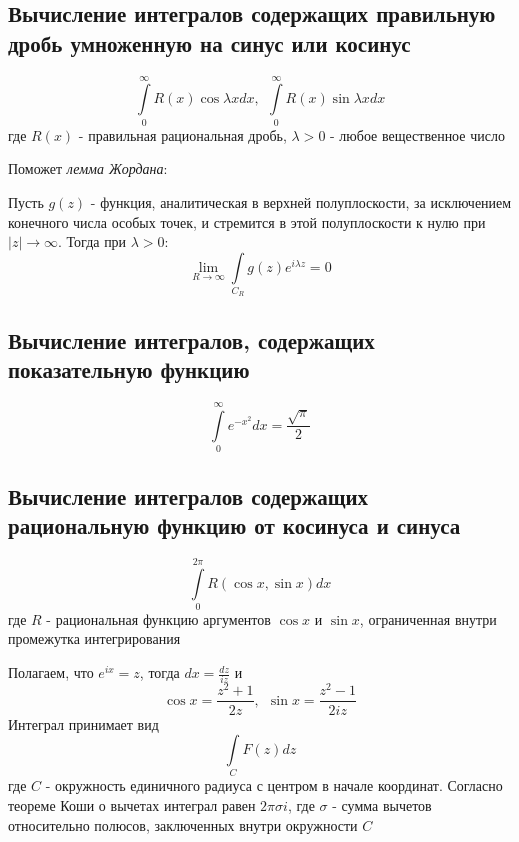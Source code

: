 \documentclass[12pt]{extarticle}
\begin{document}
\subsection{Вычисление интегралов содержащих правильную дробь умноженную
на синус или косинус}
\begin{displaymath}
    \int\limits_{0}^{\infty}R(x)\cos{\lambda x}dx
    ,\ \ \int\limits_{0}^{\infty}R(x)\sin{\lambda x}dx
\end{displaymath}
где $R(x)$ - правильная рациональная дробь, $\lambda > 0$ - любое
вещественное число
\par Поможет \textit{лемма Жордана}:
\par Пусть $g(z)$ - функция, аналитическая в верхней полуплоскости, за
исключением конечного числа особых точек, и стремится в этой
полуплоскости к нулю при $\left|z\right| \to \infty$. Тогда при
$\lambda>0$:
\begin{displaymath}
    \lim\limits_{R\rightarrow \infty}\int\limits_{C_{R}}g(z)e^{i\lambda
    z}=0
\end{displaymath}

\subsection{Вычисление интегралов, содержащих показательную функцию}
\begin{displaymath}
    \int\limits_{0}^{\infty}e^{-x^{2}}dx=\frac{\sqrt{\pi}}{2}
\end{displaymath}

\subsection{Вычисление интегралов содержащих рациональную функцию от
косинуса и синуса}
\begin{displaymath}
    \int\limits_{0}^{2\pi}R(\cos{x},\sin{x})dx
\end{displaymath}
где $R$ - рациональная функцию аргументов $\cos{x}$ и $\sin{x}$,
ограниченная внутри промежутка интегрирования
\par Полагаем, что $e^{ix}=z$, тогда $dx=\frac{dz}{iz}$ и
\begin{displaymath}
    \cos{x}=\frac{z^{2}+1}{2z}
    ,\ \ \sin{x}=\frac{z^{2}-1}{2iz}
\end{displaymath}
Интеграл принимает вид
\begin{displaymath}
    \int\limits_{C}F(z)dz
\end{displaymath}
где $C$ - окружность единичного радиуса с центром в начале координат.
Согласно теореме Коши о вычетах интеграл равен $2\pi\sigma i$, где
$\sigma$ - сумма вычетов относительно полюсов, заключенных внутри
окружности $C$
\end{document}
